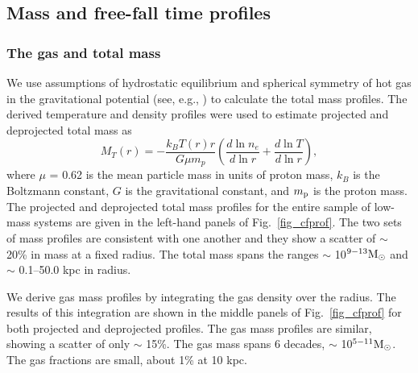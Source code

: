 \documentclass[iop]{emulateapj}
\begin{document}
\subsection{Mass and free-fall time profiles}
\subsubsection{The gas and total mass}
We use assumptions of hydrostatic equilibrium and spherical symmetry of hot gas in the gravitational potential (see, e.g., \citealt{Navarro:10, Babyk:13, Babyk:13oap, Babyk:14, Babyk_book:15, Babyk:16}) to calculate the total mass profiles. The derived temperature and density profiles were used to estimate projected and deprojected total mass as
\begin{equation}
M_{T}(r) = -\frac{k_BT(r)r}{G \mu m_{p}} \left( \frac{d \ln n_{e} }{d \ln r} + \frac{d \ln T}{d \ln r}\right),
\label{mtr}
\end{equation}
where $\mu$ = 0.62 is the mean particle mass in units of proton mass, $k_B$ is the Boltzmann constant, $G$ is the gravitational constant, and $m_{\rm p}$ is the proton mass. The projected and deprojected total mass profiles for the entire sample of low-mass systems are given in the left-hand panels of Fig.~\ref{fig_cfprof}. The two sets of mass profiles are consistent with one another and they show a scatter of $\sim$ 20\% in mass at a fixed radius. The total mass spans the ranges $\sim$ 10$^{9-13}\rm M_{\odot}$ and $\sim$ 0.1--50.0 kpc in radius. 

We derive gas mass profiles by integrating the gas density over the radius. The results of this integration are shown in the middle panels of Fig.~\ref{fig_cfprof} for both projected and deprojected profiles. The gas mass profiles are similar, showing a scatter of only $\sim$ 15\%. The gas mass spans 6 decades, $\sim$ 10$^{5-11}\rm M_{\odot}$. The gas fractions are small, about 1\% at 10 kpc.
\end{document}
